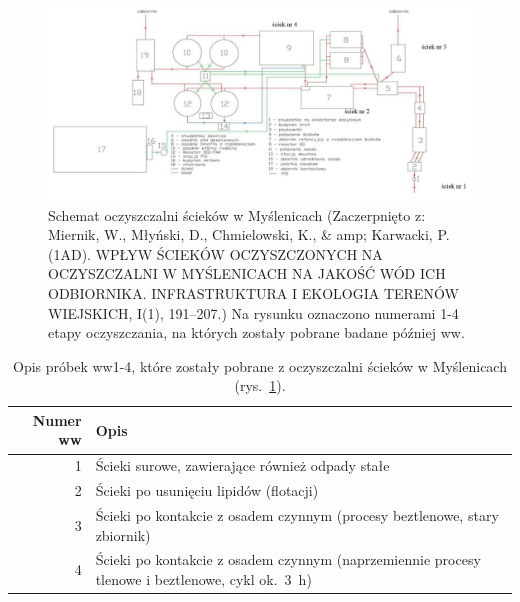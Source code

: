 \vspace{\fill}

\begin{figure}[h!]
    \label{fig:5}
    \centering
    \includegraphics[width=\textwidth]{figures/wwtp}
    \caption{
        Schemat oczyszczalni ścieków w Myślenicach
        (Zaczerpnięto z: Miernik, W., Młyński, D., Chmielowski, K.,
        \& amp; Karwacki, P. (1AD). WPŁYW ŚCIEKÓW
        OCZYSZCZONYCH NA OCZYSZCZALNI W MYŚLENICACH NA JAKOŚĆ WÓD ICH ODBIORNIKA.
        INFRASTRUKTURA I EKOLOGIA TERENÓW WIEJSKICH, I(1), 191–207.)
        Na rysunku oznaczono numerami 1-4 etapy oczyszczania, na których
        zostały pobrane badane później \acrshort{ww}.}
\end{figure}

\vspace{1cm}

\begin{table}[h!]
    \label{tab:1}
    \centering
    \caption{
        Opis próbek \acrshort{ww}1-4, które zostały pobrane
        z oczyszczalni ścieków w Myślenicach (rys.~\ref{fig:5}).
    }
    \begin{tabular}{rp{10cm}}
        Numer \acrshort{ww} & Opis\\
        \hline
        1 & Ścieki surowe, zawierające również odpady stałe\\
        2 & Ścieki po usunięciu lipidów (flotacji)\\
        3 & Ścieki po kontakcie z osadem czynnym \newline (procesy beztlenowe, stary zbiornik)\\
        4 & Ścieki po kontakcie z osadem czynnym \newline (naprzemiennie procesy tlenowe i beztlenowe, cykl ok.\ 3~h)\\
    \end{tabular}
\end{table}


